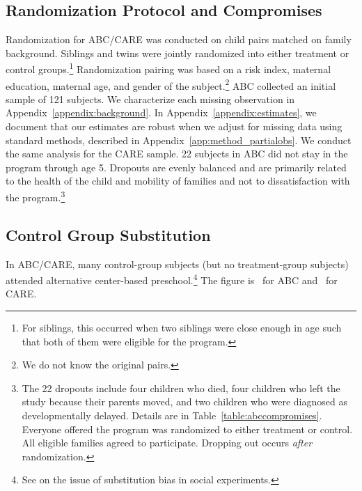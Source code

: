 \subsection{Randomization Protocol and Compromises} \label{section:randomization}

Randomization for ABC/CARE was conducted on child pairs matched on family background. Siblings and twins were jointly randomized into either treatment or control groups.\footnote{For siblings, this occurred when two siblings were close enough in age such that both of them were eligible for the program.} Randomization pairing was based on a risk index, maternal education, maternal age, and gender of the subject.\footnote{We do not know the original pairs.} ABC collected an initial sample of 121 subjects. We characterize each missing observation in Appendix~\ref{appendix:background}. In Appendix~\ref{appendix:estimates}, we document that our estimates are robust when we adjust for missing data using standard methods, described in Appendix~\ref{app:method_partialobs}. We conduct the same analysis for the CARE sample. 22 subjects in ABC did not stay in the program through age 5. Dropouts are evenly balanced and are primarily related to the health of the child and mobility of families and not to dissatisfaction with the program.\footnote{The 22 dropouts include four children who died, four children who left the study because their parents moved, and two children who were diagnosed as developmentally delayed. Details are in Table~\ref{table:abccompromises}. Everyone offered the program was randomized to either treatment or control. All eligible families agreed to participate. Dropping out occurs \emph{after} randomization.}

\subsection{Control Group Substitution}

In ABC/CARE, many control-group subjects (but no treatment-group subjects) attended alternative center-based preschool.\footnote{See \cite{Heckman_Hohmann_etal_2000_QJE} on the issue of substitution bias in social experiments.} The figure is \treatsubsabc\ for ABC and \treatsubscarec\ for CARE.

